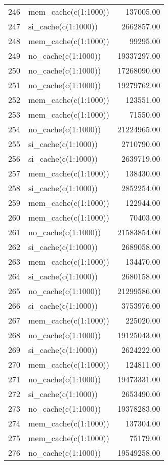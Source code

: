 \begin{table}[ht]
\begin{tabular}{rlr}
  246 & mem\_cache(c(1:1000)) & 137005.00 \\ 
  247 & si\_cache(c(1:1000)) & 2662857.00 \\ 
  248 & mem\_cache(c(1:1000)) & 99295.00 \\ 
  249 & no\_cache(c(1:1000)) & 19337297.00 \\ 
  250 & no\_cache(c(1:1000)) & 17268090.00 \\ 
  251 & no\_cache(c(1:1000)) & 19279762.00 \\ 
  252 & mem\_cache(c(1:1000)) & 123551.00 \\ 
  253 & mem\_cache(c(1:1000)) & 71550.00 \\ 
  254 & no\_cache(c(1:1000)) & 21224965.00 \\ 
  255 & si\_cache(c(1:1000)) & 2710790.00 \\ 
  256 & si\_cache(c(1:1000)) & 2639719.00 \\ 
  257 & mem\_cache(c(1:1000)) & 138430.00 \\ 
  258 & si\_cache(c(1:1000)) & 2852254.00 \\ 
  259 & mem\_cache(c(1:1000)) & 122944.00 \\ 
  260 & mem\_cache(c(1:1000)) & 70403.00 \\ 
  261 & no\_cache(c(1:1000)) & 21583854.00 \\ 
  262 & si\_cache(c(1:1000)) & 2689058.00 \\ 
  263 & mem\_cache(c(1:1000)) & 134470.00 \\ 
  264 & si\_cache(c(1:1000)) & 2680158.00 \\ 
  265 & no\_cache(c(1:1000)) & 21299586.00 \\ 
  266 & si\_cache(c(1:1000)) & 3753976.00 \\ 
  267 & mem\_cache(c(1:1000)) & 225020.00 \\ 
  268 & no\_cache(c(1:1000)) & 19125043.00 \\ 
  269 & si\_cache(c(1:1000)) & 2624222.00 \\ 
  270 & mem\_cache(c(1:1000)) & 124811.00 \\ 
  271 & no\_cache(c(1:1000)) & 19473331.00 \\ 
  272 & si\_cache(c(1:1000)) & 2653490.00 \\ 
  273 & no\_cache(c(1:1000)) & 19378283.00 \\ 
  274 & mem\_cache(c(1:1000)) & 137304.00 \\ 
  275 & mem\_cache(c(1:1000)) & 75179.00 \\ 
  276 & no\_cache(c(1:1000)) & 19549258.00 \\ 

\end{tabular}
\end{table}
